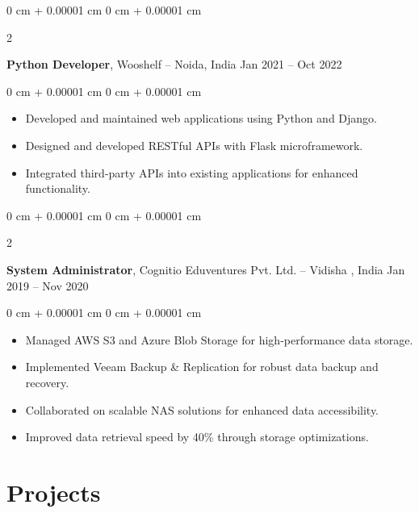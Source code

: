 \documentclass[10pt, letterpaper]{article}
\newenvironment{highlights}{
    \begin{itemize}[
        topsep=0.10 cm,
        parsep=0.10 cm,
        partopsep=0pt,
        itemsep=0pt,
        leftmargin=0 cm + 10pt
    ]
}{
    \end{itemize}
} %
\newenvironment{onecolentry}{
    \begin{adjustwidth}{
        0 cm + 0.00001 cm
    }{
        0 cm + 0.00001 cm
    }
}{
    \end{adjustwidth}
} %
\newenvironment{twocolentry}[2][]{
    \onecolentry
    \def\secondColumn{#2}
    \setcolumnwidth{\fill, 4.5 cm}
    \begin{paracol}{2}
}{
    \switchcolumn \raggedleft \secondColumn
    \end{paracol}
    \endonecolentry
} %
\begin{document}
        \vspace{0.2 cm}

        \begin{twocolentry}{
            Jan 2021 – Oct 2022
        }
            \textbf{Python Developer}, Wooshelf -- Noida, India\end{twocolentry}

        \vspace{0.10 cm}
        \begin{onecolentry}
            \begin{highlights}
                \item Developed and maintained web applications using Python and Django.
                \item Designed and developed RESTful APIs with Flask microframework.
                \item Integrated third-party APIs into existing applications for enhanced functionality.
            \end{highlights}
        \end{onecolentry}


        \vspace{0.2 cm}

        \begin{twocolentry}{
            Jan 2019 – Nov 2020
        }
            \textbf{System Administrator}, Cognitio Eduventures Pvt. Ltd. -- Vidisha
            , India\end{twocolentry}

        \vspace{0.10 cm}
        \begin{onecolentry}
            \begin{highlights}
                \item Managed AWS S3 and Azure Blob Storage for high-performance data storage.
                \item Implemented Veeam Backup \& Replication for robust data backup and recovery.
                \item Collaborated on scalable NAS solutions for enhanced data accessibility.
                \item Improved data retrieval speed by 40\% through storage optimizations.
                
            \end{highlights}
        \end{onecolentry}


    \section{Projects}
\end{document}
